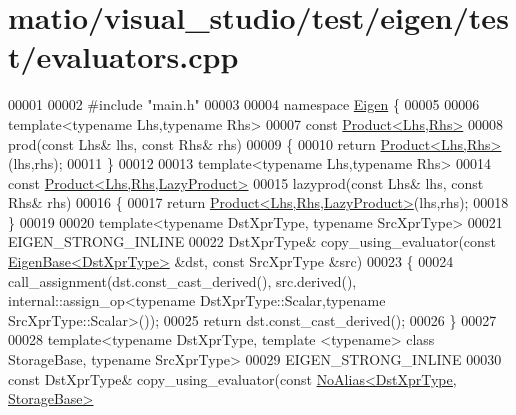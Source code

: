 \hypertarget{matio_2visual__studio_2test_2eigen_2test_2evaluators_8cpp_source}{}\section{matio/visual\+\_\+studio/test/eigen/test/evaluators.cpp}
\label{matio_2visual__studio_2test_2eigen_2test_2evaluators_8cpp_source}

\begin{DoxyCode}
00001 
00002 \textcolor{preprocessor}{#include "main.h"}
00003 
00004 \textcolor{keyword}{namespace }\hyperlink{namespace_eigen}{Eigen} \{
00005 
00006   \textcolor{keyword}{template}<\textcolor{keyword}{typename} Lhs,\textcolor{keyword}{typename} Rhs>
00007   \textcolor{keyword}{const} \hyperlink{group___core___module}{Product<Lhs,Rhs>}
00008   prod(\textcolor{keyword}{const} Lhs& lhs, \textcolor{keyword}{const} Rhs& rhs)
00009   \{
00010     \textcolor{keywordflow}{return} \hyperlink{group___core___module}{Product<Lhs,Rhs>}(lhs,rhs);
00011   \}
00012 
00013   \textcolor{keyword}{template}<\textcolor{keyword}{typename} Lhs,\textcolor{keyword}{typename} Rhs>
00014   \textcolor{keyword}{const} \hyperlink{group___core___module_class_eigen_1_1_product}{Product<Lhs,Rhs,LazyProduct>}
00015   lazyprod(\textcolor{keyword}{const} Lhs& lhs, \textcolor{keyword}{const} Rhs& rhs)
00016   \{
00017     \textcolor{keywordflow}{return} \hyperlink{group___core___module_class_eigen_1_1_product}{Product<Lhs,Rhs,LazyProduct>}(lhs,rhs);
00018   \}
00019   
00020   \textcolor{keyword}{template}<\textcolor{keyword}{typename} DstXprType, \textcolor{keyword}{typename} SrcXprType>
00021   EIGEN\_STRONG\_INLINE
00022   DstXprType& copy\_using\_evaluator(\textcolor{keyword}{const} \hyperlink{group___core___module_struct_eigen_1_1_eigen_base}{EigenBase<DstXprType>} &dst, \textcolor{keyword}{const} SrcXprType 
      &src)
00023   \{
00024     call\_assignment(dst.const\_cast\_derived(), src.derived(), internal::assign\_op<typename
       DstXprType::Scalar,typename SrcXprType::Scalar>());
00025     \textcolor{keywordflow}{return} dst.const\_cast\_derived();
00026   \}
00027   
00028   \textcolor{keyword}{template}<\textcolor{keyword}{typename} DstXprType, \textcolor{keyword}{template} <\textcolor{keyword}{typename}> \textcolor{keyword}{class }StorageBase, \textcolor{keyword}{typename} SrcXprType>
00029   EIGEN\_STRONG\_INLINE
00030   \textcolor{keyword}{const} DstXprType& copy\_using\_evaluator(\textcolor{keyword}{const} \hyperlink{group___core___module_class_eigen_1_1_no_alias}{NoAlias<DstXprType, StorageBase>}

\end{DoxyCode}
